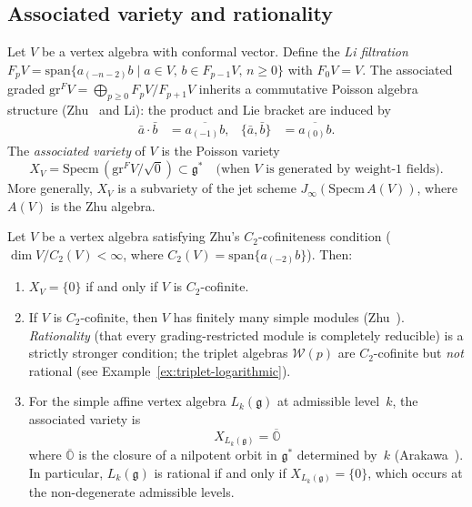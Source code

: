 \subsection{Associated variety and rationality}

\begin{definition}
\label{def:associated-variety}
Let $V$ be a vertex algebra with conformal vector. Define the
\emph{Li filtration} $F_p V = \mathrm{span}\{a_{(-n-2)} b \mid
a \in V,\, b \in F_{p-1} V,\, n \geq 0\}$ with $F_0 V = V$.
The associated graded $\mathrm{gr}^F V = \bigoplus_{p \geq 0}
F_p V / F_{p+1} V$ inherits a commutative Poisson algebra structure
(Zhu~\cite{Zhu96} and Li): the product and Lie bracket are induced by
\begin{align}
\bar{a} \cdot \bar{b} &= \overline{a_{(-1)} b}, &
\{\bar{a}, \bar{b}\} &= \overline{a_{(0)} b}.
\end{align}
The \emph{associated variety} of $V$ is the Poisson variety
\[
X_V = \mathrm{Specm}\,(\mathrm{gr}^F V / \sqrt{0}) \subset
\mathfrak{g}^* \quad
\text{(when $V$ is generated by weight-$1$ fields)}.
\]
More generally, $X_V$ is a subvariety of the jet scheme
$J_\infty(\mathrm{Specm}\, A(V))$, where $A(V)$ is the Zhu algebra.
\end{definition}

\begin{theorem}
\label{thm:arakawa-rationality}
Let $V$ be a vertex algebra satisfying Zhu's $C_2$-cofiniteness
condition \textup{(}$\dim V / C_2(V) < \infty$, where
$C_2(V) = \mathrm{span}\{a_{(-2)} b\}$\textup{)}. Then:
\begin{enumerate}[label=\textup{(\roman*)}]
\item $X_V = \{0\}$ if and only if $V$ is $C_2$-cofinite.
\item If $V$ is $C_2$-cofinite, then $V$ has finitely many simple
 modules \textup{(}Zhu~\cite{Zhu96}\textup{)}.
 \emph{Rationality} (that every grading-restricted module is
 completely reducible) is a strictly stronger condition; the
 triplet algebras $\mathcal{W}(p)$ are $C_2$-cofinite but
 \emph{not} rational
 \textup{(}see Example~\ref{ex:triplet-logarithmic}\textup{)}.
\item For the simple affine vertex algebra
 $L_k(\mathfrak{g})$ at admissible level~$k$, the associated variety
 is
 \[
 X_{L_k(\mathfrak{g})} = \overline{\mathbb{O}}
 \]
 where $\overline{\mathbb{O}}$ is the closure of a nilpotent
 orbit in $\mathfrak{g}^*$ determined by~$k$
 \textup{(}Arakawa~\cite{Arakawa17}\textup{)}.
 In particular, $L_k(\mathfrak{g})$ is rational if and only if
 $X_{L_k(\mathfrak{g})} = \{0\}$, which occurs at the
 non-degenerate admissible levels.
\end{enumerate}
\end{theorem}

